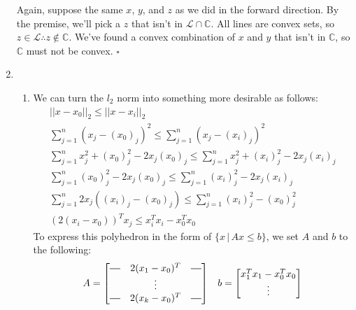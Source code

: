 \documentclass[12pt]{article}
\newcommand*{\horzbar}{\rule[.5ex]{2.5ex}{0.5pt}}
\begin{document}
\begin{enumerate}
            Again, suppose the same $x$, $y$, and $z$ as we did in the forward direction.
            By the premise, we'll pick a $z$ that isn't in $\mathcal{L} \cap \mathbb{C}$.
            All lines are convex sets, so $z \in \mathcal{L} \therefore z \notin \mathbb{C}$.
            We've found a convex combination of $x$ and $y$ that isn't in $\mathbb{C}$,
            so $\mathbb{C}$ must not be convex. $\square$
      \item \begin{enumerate}
                  \item We can turn the $l_2$ norm into something more desirable as follows:
                        \begin{gather*}
                              ||x-x_0||_2 \le ||x-x_i||_2 \\
                              \sum_{j=1}^{n} (x_j - (x_0)_j)^2 \le \sum_{j=1}^{n} (x_j - (x_i)_j)^2 \\
                              \sum_{j=1}^{n} x_j^2 + (x_0)_j^2 - 2x_j(x_0)_j \le \sum_{j=1}^{n} x_j^2 + (x_i)_j^2 - 2x_j(x_i)_j \\
                              \sum_{j=1}^{n} (x_0)_j^2 - 2x_j(x_0)_j \le \sum_{j=1}^{n} (x_i)_j^2 - 2x_j(x_i)_j \\
                              \sum_{j=1}^{n} 2x_j((x_i)_j - (x_0)_j) \le \sum_{j=1}^{n} (x_i)_j^2 - (x_0)_j^2 \\
                              (2(x_i - x_0))^T x_j \le x_i^T x_i - x_0^T x_0
                        \end{gather*}
                        To express this polyhedron in the form of $\{x\,|\,Ax \le b\}$, we set $A$ and $b$ to the following:
                        \begin{align*}
                              A=\begin{bmatrix}
                                      \horzbar & 2(x_1 - x_0)^T & \horzbar \\
                                               & \vdots         &          \\
                                      \horzbar & 2(x_k - x_0)^T & \horzbar
                                \end{bmatrix}
                               &  & b=\begin{bmatrix}
                                            x_1^T x_1 - x_0^T x_0 \\
                                            \vdots                \\

\end{bmatrix}
\end{align*}
\end{enumerate}
\end{enumerate}
\end{document}
